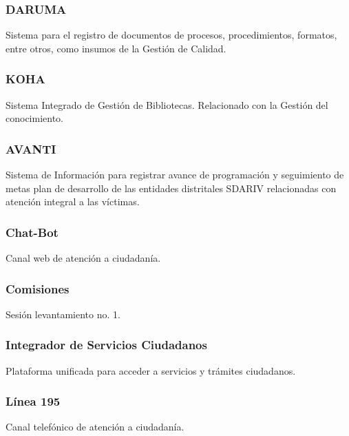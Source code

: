 \documentclass[
	a4paper, %
	12pt, %
]{include/CSSullivanBusinessReport}
\begin{document}
\subsubsection{DARUMA}\label{sec:daruma}

Sistema para el registro de documentos de procesos, procedimientos,
formatos, entre otros, como insumos de la Gestión de Calidad.

\subsubsection{KOHA}\label{sec:koha}

Sistema Integrado de Gestión de Bibliotecas. Relacionado con la Gestión
del conocimiento.

\subsubsection{AVANTI}\label{sec:avanti}

Sistema de Información para registrar avance de programación y
seguimiento de metas plan de desarrollo de las entidades distritales
SDARIV relacionadas con atención integral a las víctimas.

\subsubsection{Chat-Bot}\label{sec:chat-bot}

Canal web de atención a ciudadanía.

\subsubsection{Comisiones}\label{sec:comisiones}

Sesión levantamiento no. 1.

\subsubsection{Integrador de Servicios
Ciudadanos}\label{sec:integrador-de-servicios-ciudadanos}

Plataforma unificada para acceder a servicios y trámites ciudadanos.

\subsubsection{Línea 195}\label{sec:luxednea-195}

Canal telefónico de atención a ciudadanía.
\end{document}
